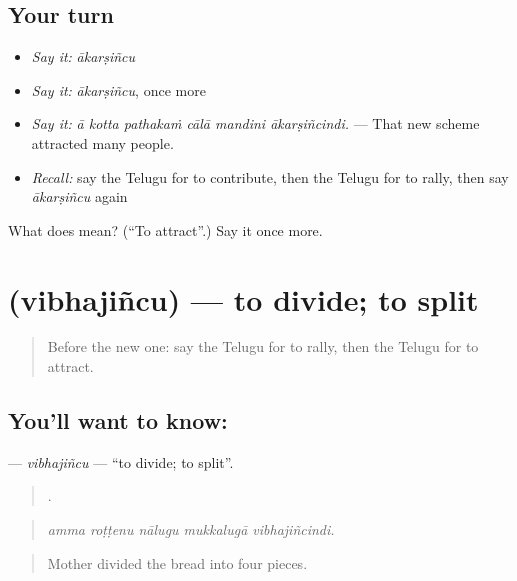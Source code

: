 \subsection*{Your turn}
\begin{itemize}
\raggedright
  \item \emph{Say it:} \emph{ākarṣiñcu}
  \item \emph{Say it:} \emph{ākarṣiñcu}, once more
  \item \emph{Say it:} \emph{ā kotta pathakaṁ cālā mandini ākarṣiñcindi.} — That new scheme attracted many people.
  \item \emph{Recall:} say the Telugu for to contribute, then the Telugu for to rally, then say \emph{ākarṣiñcu} again
\end{itemize}

\begin{tcolorbox}[breakable,colback=teal!4,colframe=teal!35!black,title={Before you move on}]
What does  mean? (\textquotedblleft{}To attract\textquotedblright{}.) Say it once more.
\end{tcolorbox}
\section[\texorpdfstring{\te{విభజించు} (vibhajiñcu)}{విభజించు (vibhajiñcu)}]{ (vibhajiñcu) — to divide; to split}

\label{lesson:TE-C436-vibhajincu}



\begin{quote}
Before the new one: say the Telugu for to rally, then the Telugu for to attract.
\end{quote}

\subsection*{You'll want to know: }
\textbf{} — \emph{vibhajiñcu} — \textquotedblleft{}to divide; to split\textquotedblright{}.

\begin{quote}
    .
\end{quote}

\begin{quote}
\emph{amma roṭṭenu nālugu mukkalugā vibhajiñcindi.}
\end{quote}

\begin{quote}
Mother divided the bread into four pieces.
\end{quote}

